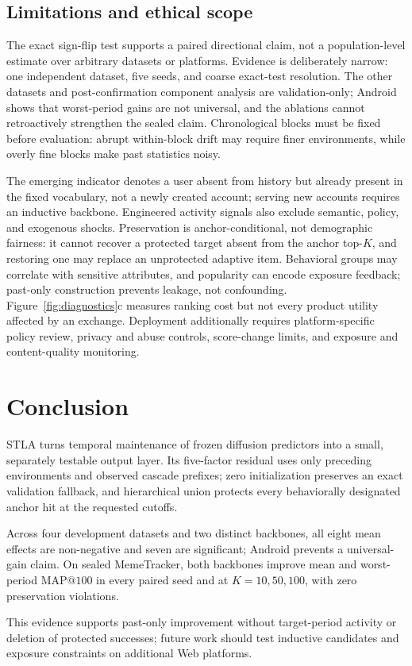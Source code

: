 \documentclass[sigconf,anonymous,review]{acmart}
\makeatletter
\newcommand{\method}{\textsc{STLA}\xspace}
\newcommand{\mapk}{\mathrm{MAP}@100}
\makeatother
\begin{document}
\subsection{Limitations and ethical scope}
The exact sign-flip test supports a paired directional claim, not a population-level estimate over arbitrary datasets or platforms. Evidence is deliberately narrow: one independent dataset, five seeds, and coarse exact-test resolution. The other datasets and post-confirmation component analysis are validation-only; Android shows that worst-period gains are not universal, and the ablations cannot retroactively strengthen the sealed claim. Chronological blocks must be fixed before evaluation: abrupt within-block drift may require finer environments, while overly fine blocks make past statistics noisy.

The emerging indicator denotes a user absent from history but already present in the fixed vocabulary, not a newly created account; serving new accounts requires an inductive backbone. Engineered activity signals also exclude semantic, policy, and exogenous shocks. Preservation is anchor-conditional, not demographic fairness: it cannot recover a protected target absent from the anchor top-$K$, and restoring one may replace an unprotected adaptive item. Behavioral groups may correlate with sensitive attributes, and popularity can encode exposure feedback; past-only construction prevents leakage, not confounding. Figure~\ref{fig:diagnostics}c measures ranking cost but not every product utility affected by an exchange. Deployment additionally requires platform-specific policy review, privacy and abuse controls, score-change limits, and exposure and content-quality monitoring.

\section{Conclusion}
\method turns temporal maintenance of frozen diffusion predictors into a small, separately testable output layer. Its five-factor residual uses only preceding environments and observed cascade prefixes; zero initialization preserves an exact validation fallback, and hierarchical union protects every behaviorally designated anchor hit at the requested cutoffs.

Across four development datasets and two distinct backbones, all eight mean effects are non-negative and seven are significant; Android prevents a universal-gain claim. On sealed MemeTracker, both backbones improve mean and worst-period $\mapk$ in every paired seed and at $K=10,50,100$, with zero preservation violations.

This evidence supports past-only improvement without target-period activity or deletion of protected successes; future work should test inductive candidates and exposure constraints on additional Web platforms.

\clearpage



\end{document}
